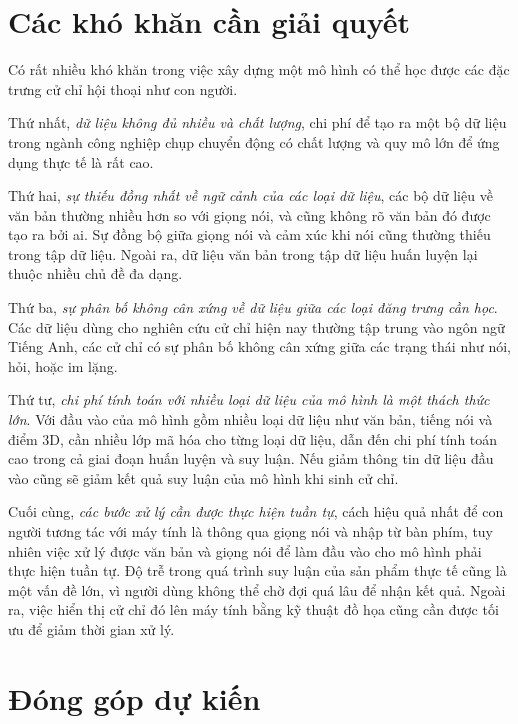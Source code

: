 \section{Các khó khăn cần giải quyết}
\label{sec:difficult}

Có rất nhiều khó khăn trong việc xây dựng một mô hình có thể học được các đặc trưng cử chỉ hội thoại như con người.

Thứ nhất, \textit{dữ liệu không đủ nhiều và chất lượng}, chi phí để tạo ra một bộ dữ liệu trong ngành công nghiệp chụp chuyển động có chất lượng và quy mô lớn để ứng dụng thực tế là rất cao.

Thứ hai, \textit{sự thiếu đồng nhất về ngữ cảnh của các loại dữ liệu}, các bộ dữ liệu về văn bản thường nhiều hơn so với giọng nói, và cũng không rõ văn bản đó được tạo ra bởi ai. Sự đồng bộ giữa giọng nói và cảm xúc khi nói cũng thường thiếu trong tập dữ liệu. Ngoài ra, dữ liệu văn bản trong tập dữ liệu huấn luyện lại thuộc nhiều chủ đề đa dạng.
 
Thứ ba, \textit{sự phân bố không cân xứng về  dữ liệu giữa các loại đăng trưng cần học}. Các dữ liệu dùng cho nghiên cứu cử chỉ hiện nay thường tập trung vào ngôn ngữ Tiếng Anh, các cử chỉ có sự phân bố không cân xứng giữa các trạng thái như nói, hỏi, hoặc im lặng.

Thứ tư, \textit{chi phí tính toán với nhiều loại dữ liệu của mô hình là một thách thức lớn}. Với đầu vào của mô hình gồm nhiều loại dữ liệu như văn bản, tiếng nói và điểm 3D, cần nhiều lớp mã hóa cho từng loại dữ liệu, dẫn đến chi phí tính toán cao trong cả giai đoạn huấn luyện và suy luận. Nếu giảm thông tin dữ liệu đầu vào cũng sẽ giảm kết quả suy luận của mô hình khi sinh cử chỉ.

Cuối cùng, \textit{các bước xử lý cần được thực hiện tuần tự}, cách hiệu quả nhất để con người tương tác với máy tính là thông qua giọng nói và nhập từ bàn phím, tuy nhiên việc xử lý được văn bản và giọng nói để làm đầu vào cho mô hình phải thực hiện tuần tự. Độ trễ trong quá trình suy luận của sản phẩm thực tế cũng là một vấn đề lớn, vì người dùng không thể chờ đợi quá lâu để nhận kết quả. Ngoài ra, việc hiển thị cử chỉ đó lên máy tính bằng kỹ thuật đồ họa cũng cần được tối ưu để giảm thời gian xử lý.


\section{Đóng góp dự kiến}


